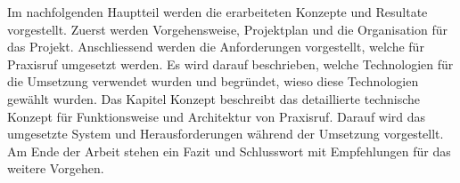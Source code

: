 Im nachfolgenden Hauptteil werden die erarbeiteten Konzepte und Resultate vorgestellt.
Zuerst werden Vorgehensweise, Projektplan und die Organisation für das Projekt.
Anschliessend werden die Anforderungen vorgestellt, welche für Praxisruf umgesetzt werden.
Es wird darauf beschrieben, welche Technologien für die Umsetzung verwendet wurden und begründet, wieso diese Technologien gewählt wurden.
Das Kapitel Konzept beschreibt das detaillierte technische Konzept für Funktionsweise und Architektur von Praxisruf.
Darauf wird das umgesetzte System und Herausforderungen während der Umsetzung vorgestellt.
Am Ende der Arbeit stehen ein Fazit und Schlusswort mit Empfehlungen für das weitere
Vorgehen.

\clearpage
